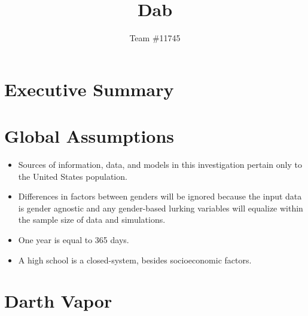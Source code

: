 \documentclass[12pt,letterpaper]{article}
\title{Dab}
\author{Team \#11745}
\begin{document}
\maketitle
\newpage

\section*{Executive Summary}

\newpage
\tableofcontents

\newpage
\section{Global Assumptions}

\begin{itemize}
  \item Sources of information, data, and models in this investigation pertain only to the United States population.
  \item Differences in factors between genders will be ignored because the input data is gender agnostic and any gender-based lurking variables will equalize within the sample size of data and simulations.
  \item One year is equal to 365 days.
  \item A high school is a closed-system, besides socioeconomic factors.
\end{itemize}

\section{Darth Vapor}
\end{document}
